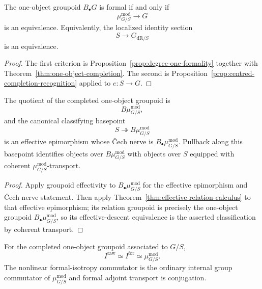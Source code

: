 \begin{corollary}
\label{cor:one-object-formality-recognition}
The one-object groupoid $B_\bullet G$ is formal if and only if
\[
    \mu^{\mathrm{mod}}_{G/S}
    \longrightarrow
    G
\]
is an equivalence.  Equivalently, the localized identity section
\[
    S
    \longrightarrow
    G_{\mathrm{dR}/S}
\]
is an equivalence.
\end{corollary}

\begin{proof}
The first criterion is
Proposition~\ref{prop:degree-one-formality} together with
Theorem~\ref{thm:one-object-completion}.  The second is
Proposition~\ref{prop:centred-completion-recognition} applied to
$e:S\to G$.
\end{proof}

\begin{corollary}
\label{cor:formal-identity-classifying-quotient}
The quotient of the completed one-object groupoid is
\[
    B\mu^{\mathrm{mod}}_{G/S},
\]
and the canonical classifying basepoint
\[
    S\twoheadrightarrow B\mu^{\mathrm{mod}}_{G/S}
\]
is an effective epimorphism whose \v{C}ech nerve is
$B_\bullet\mu^{\mathrm{mod}}_{G/S}$.  Pullback along this basepoint identifies
objects over $B\mu^{\mathrm{mod}}_{G/S}$ with objects over $S$ equipped with
coherent $\mu^{\mathrm{mod}}_{G/S}$-transport.
\end{corollary}

\begin{proof}
Apply groupoid effectivity to
$B_\bullet\mu^{\mathrm{mod}}_{G/S}$ for the effective epimorphism and \v{C}ech
nerve statement.  Then apply
Theorem~\ref{thm:effective-relation-calculus} to that effective epimorphism;
its relation groupoid is precisely the one-object groupoid
$B_\bullet\mu^{\mathrm{mod}}_{G/S}$, so its effective-descent equivalence is
the asserted classification by coherent transport.
\end{proof}

\begin{proposition}
\label{prop:one-object-isotropy}
For the completed one-object groupoid associated to $G/S$,
\[
    I^{\mathrm{raw}}
    \simeq
    I^{\mathrm{for}}
    \simeq
    \mu^{\mathrm{mod}}_{G/S}.
\]
The nonlinear formal-isotropy commutator is the ordinary internal group
commutator of $\mu^{\mathrm{mod}}_{G/S}$ and formal adjoint transport is
conjugation.
\end{proposition}

